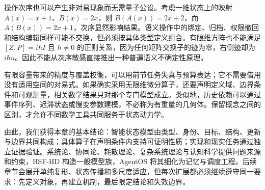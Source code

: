 操作次序也可以产生非对易现象而无需量子公设。考虑一维状态上的映射 $A(x)=x+1$、$B(x)=2x$，则 $B(A(x))=2x+2$，而 $A(B(x))=2x+1$，次序显然影响结果。语义操作中的绑定、归档、权限撤回和结构编辑同样可能不交换，但必须按具体类型定义组合。有限维方阵也不能满足 $[Z,P]=i\hbar I$ 且 $\hbar\ne0$ 的正则关系，因为任何矩阵交换子的迹为零，右侧迹却为 $i\hbar n$。因此不能从次序敏感直接推出一种普遍语义不确定性原理。

有限容量带来的精度与覆盖权衡，可以用前节任务失真与预算表达；它不需要借用没有适用空间的对易式。如果确实采用无限维微分算子，还要声明定义域、边界条件和可观测量，相关数学结果只对那个专门模型成立。类似地，历史依赖可以通过事件序列、迟滞状态或慢变参数建模，不必称为有重量的几何体。保留概念之间的区别，才允许不同数学工具共同服务于状态动力学。

由此，我们获得本章的基本结论：智能状态模型由类型、身份、目标、结构、更新与边界共同构成；具体算子在声明条件内支持可证明性质；实现和现实任务通过独立证据验证。系统论、协同论、耗散理论、复杂系统理论与认知科学提供问题来源和约束，HSF-HD 构造一般模型族，AgentOS 将其细化为记忆与调度工程。后续章节会展开单纯复形、状态传播和多尺度适应，但每次扩展都必须继续遵守同一要求：先定义对象，再建立机制，最后限定结论和失效边界。
